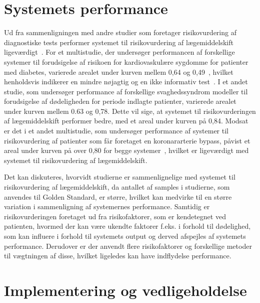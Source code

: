 \section{Systemets performance}
Ud fra sammenligningen med andre studier som foretager risikovurdering af diagnostiske tests performer systemet til risikovurdering af lægemiddelskift ligeværdigt~\citep{Chan2009,VanStraten2010}. For et multistudie, der undersøger performancen af forskellige systemer til forudsigelse af risikoen for kardiovaskulære sygdomme for patienter med diabetes, varierede arealet under kurven mellem 0,64 og 0,49~\citep{Chan2009}, hvilket henholdsvis indikerer en mindre nøjagtig og en ikke informativ test~\citep{Greiner2000}. I et andet studie, som undersøger performance af forskellige svaghedssyndrom modeller til forudsigelse af dødeligheden for periode indlagte patienter, varierede arealet under kurven mellem 0.63 og 0,78. Dette vil sige, at systemet til risikovurderingen af lægemiddelskift performer bedre, med et areal under kurven på 0,84.  Modsat er det i et andet multistudie, som undersøger performance af systemer til risikovurdering af patienter som får foretaget en koronararterie bypass, påvist et areal under kurven på over 0,80 for begge systemer~\citep{VanStraten2010}, hvilket er ligeværdigt med systemet til risikovurdering af lægemiddelskift.

Det kan diskuteres, hvorvidt studierne er sammenlignelige med systemet til risikovurdering af lægemiddelskift, da antallet af samples i studierne, som anvendes til Golden Standard,  er større, hvilket kan medvirke til en større variation i sammenligning af systemernes performance. Samtidig er risikovurderingen foretaget ud fra risikofaktorer, som er kendetegnet ved patienten, hvormed der kan være ukendte faktorer f.eks. i forhold til dødelighed, som kan influere i forhold til systemets output og derved afspejles af systemets performance. Derudover er der anvendt flere risikofaktorer og forskellige metoder til vægtningen af disse, hvilket ligeledes kan have indflydelse performance. 

\section{Implementering og vedligeholdelse}

